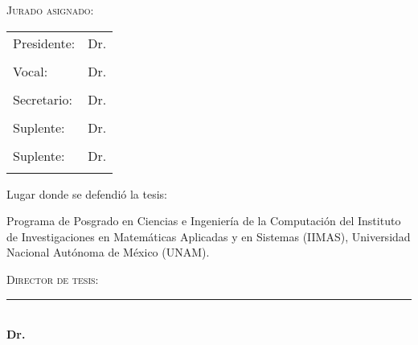 \newpage
\vspace{0.5cm}
\Large{{\scshape Jurado asignado:}}

\vspace{2.0cm}
\begin{tabular}{l l}
\Large{Presidente:} & \Large{Dr. } \\
\\ 
\Large{Vocal:} & \Large{Dr. }\\
\\
\Large{Secretario:} & \Large{Dr. }\\
\\
\Large{Suplente:} & \Large{Dr.}\\
\\
\Large{Suplente:} & \Large{Dr.}\\
\\ 
\end{tabular}

\vspace{3.5cm}
\noindent
\large {Lugar donde se defendió la tesis:}

\vspace{0.5cm}
\noindent
\large{Programa de Posgrado en Ciencias e Ingeniería de la Computación del Instituto de Investigaciones en Matemáticas Aplicadas y en Sistemas (IIMAS), Universidad Nacional Autónoma de México (UNAM).}

\vspace{2.5cm}

\begin{center}
\Large{\scshape{Director de tesis:}}
\vspace{0.8cm}


\rule[0mm]{6.5cm}{0.2mm} \\
\Large{\bf Dr.} \\


\end{center}
\normalsize

